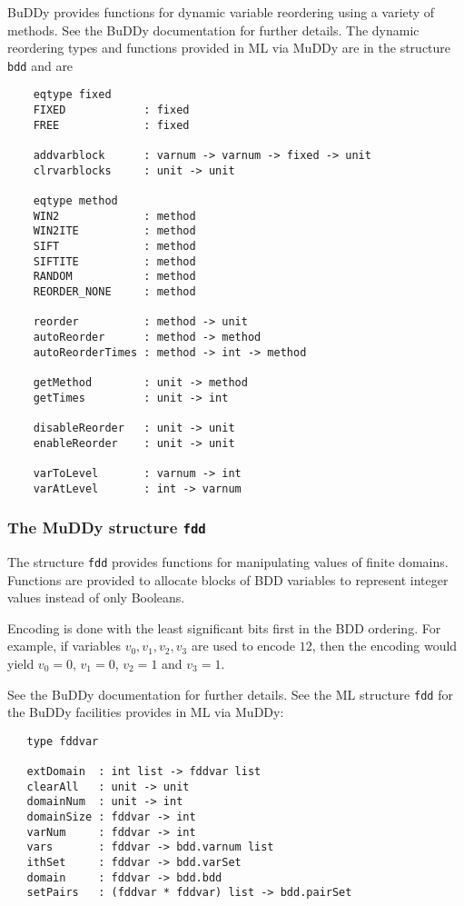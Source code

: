 \documentclass[12pt]{book}
\renewcommand{\t}[1]{\mbox{\tt #1}}
\newcommand{\Buddy}{BuDDy{}}
\newcommand{\Muddy}{MuDDy{}}
\begin{document}
\Buddy{} provides functions for dynamic variable reordering using a variety of methods.
See the \Buddy{} documentation \cite{BuDDy} for further details. The dynamic reordering
types and functions provided in ML via \Muddy{} are in the structure \t{bdd} and are

\begin{verbatim}
    eqtype fixed
    FIXED            : fixed
    FREE             : fixed

    addvarblock      : varnum -> varnum -> fixed -> unit
    clrvarblocks     : unit -> unit

    eqtype method
    WIN2             : method
    WIN2ITE          : method
    SIFT             : method
    SIFTITE          : method
    RANDOM           : method
    REORDER_NONE     : method

    reorder          : method -> unit
    autoReorder      : method -> method
    autoReorderTimes : method -> int -> method

    getMethod        : unit -> method
    getTimes         : unit -> int

    disableReorder   : unit -> unit
    enableReorder    : unit -> unit

    varToLevel       : varnum -> int
    varAtLevel       : int -> varnum
\end{verbatim}

\subsubsection{The \Muddy{} structure \t{fdd}}\label{fdd}

The structure \t{fdd} provides functions for manipulating values of finite domains.
Functions are provided to allocate blocks of BDD variables to represent integer values instead
of only Booleans.

Encoding is done with the least significant bits first in the BDD ordering. For example, if variables
$v_0, v_1, v_2, v_3$ are used to encode $12$, then the encoding would yield
$v_0=0$, $v_1=0$, $v_2=1$ and $v_3=1$.

See the \Buddy{} documentation \cite{BuDDy} for further details. See the ML structure \t{fdd}
for the \Buddy{} facilities provides in ML via \Muddy:

\begin{verbatim}
   type fddvar

   extDomain  : int list -> fddvar list
   clearAll   : unit -> unit
   domainNum  : unit -> int
   domainSize : fddvar -> int
   varNum     : fddvar -> int
   vars       : fddvar -> bdd.varnum list
   ithSet     : fddvar -> bdd.varSet
   domain     : fddvar -> bdd.bdd
   setPairs   : (fddvar * fddvar) list -> bdd.pairSet
\end{verbatim}
\end{document}
